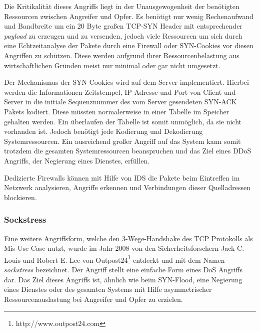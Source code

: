 Die Kritikalität dieses Angriffs liegt in der Unausgewogenheit der benötigten Ressourcen zwischen Angreifer und Opfer. Es benötigt nur wenig Rechenaufwand und Bandbreite um ein 20 Byte großen \ac{TCP}-SYN Header mit entsprechender \textit{payload} zu erzeugen und zu versenden, jedoch viele Ressourcen um sich durch eine Echtzeitanalyse der Pakete durch eine Firewall oder SYN-Cookies vor diesen Angriffen zu schützen. Diese werden aufgrund ihrer Ressourcenbelastung aus wirtschaftlichen Gründen meist nur minimal oder gar nicht umgesetzt.

Der Mechanismus der SYN-Cookies wird auf dem Server implementiert. Hierbei werden die Informationen Zeitstempel, \ac{IP} Adresse und Port von Client und Server in die initiale Sequenznummer des vom Server gesendeten SYN-ACK Pakets kodiert. Diese müssten normalerweise in einer Tabelle im Speicher gehalten werden. Ein überlaufen der Tabelle ist somit unmöglich, da sie nicht vorhanden ist. Jedoch benötigt jede Kodierung und Dekodierung Systemressourcen. Ein ausreichend großer Angriff auf das System kann somit trotzdem die gesamten Systemressourcen beanspruchen und das Ziel eines \ac{DDoS} Angriffs, der Negierung eines Dienstes, erfüllen.

Dedizierte Firewalls können mit Hilfe von \ac{IDS} die Pakete beim Eintreffen im Netzwerk analysieren, Angriffe erkennen und Verbindungen dieser Quelladressen blockieren.

\subsubsection{Sockstress}
Eine weitere Angriffsform, welche den 3-Wege-Handshake des \ac{TCP} Protokolls als Mis-Use-Case nutzt, wurde im Jahr 2008 von den Sicherheitsforschern Jack C. Louis und Robert E. Lee von Outpost24\footnote{http://www.outpost24.com} entdeckt und mit dem Namen \textit{sockstress} bezeichnet. Der Angriff stellt eine einfache Form eines \ac{DoS} Angriffs dar. Das Ziel dieses Angriffs ist, ähnlich wie beim SYN-Flood, eine Negierung eines Dienstes oder des gesamten Systems mit Hilfe asymmetrischer Ressourcenauslastung bei Angreifer und Opfer zu erzielen.

